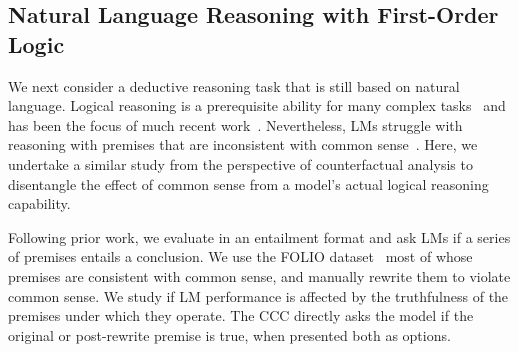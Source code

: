 \subsection{Natural Language Reasoning with First-Order Logic} \label{sec:folio-task}

We next consider a deductive reasoning task that is still based on natural language.
Logical reasoning is a prerequisite ability for many complex tasks~\citep{McCarthy_Programs59} and has been the focus of much recent work~. Nevertheless, LMs struggle with reasoning with premises that are inconsistent with common sense~\citep{dasgupta2022language,yu2023ifqa,tang2023large}. Here, we undertake a similar study from the perspective of counterfactual analysis to disentangle the effect of common sense from  a model's actual logical reasoning capability.

Following prior work, we evaluate in an entailment format and ask LMs if a series of premises entails a conclusion. We use the FOLIO dataset~\citep{han2022folio} most of whose premises are consistent with common sense, and manually rewrite them to violate common sense. We study if LM performance is affected by the truthfulness of the premises under which they operate.
The CCC directly asks the model if the original 
or post-rewrite premise is true, when presented both as options.
